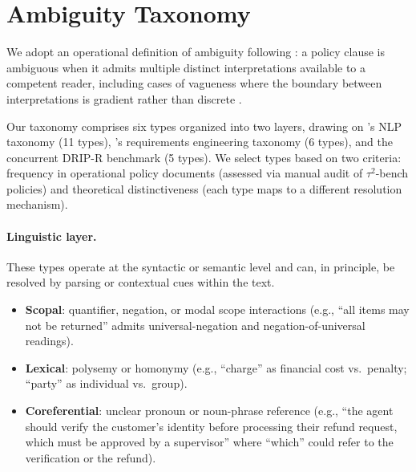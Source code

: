 \section{Ambiguity Taxonomy}
\label{sec:taxonomy}

We adopt an operational definition of ambiguity following \citet{wasow_ambiguity_2005}: a policy clause is ambiguous when it admits multiple distinct interpretations available to a competent reader, including cases of vagueness where the boundary between interpretations is gradient rather than discrete \citep{kennedy_vagueness_2007}.

Our taxonomy comprises six types organized into two layers, drawing on \citet{li_ambiguity_taxonomy_2024}'s NLP taxonomy (11 types), \citet{massey_ambiguity_re_2014}'s requirements engineering taxonomy (6 types), and the concurrent DRIP-R benchmark \citep{drip_r_2026} (5 types). We select types based on two criteria: frequency in operational policy documents (assessed via manual audit of $\tau^2$-bench policies) and theoretical distinctiveness (each type maps to a different resolution mechanism).

\paragraph{Linguistic layer.} These types operate at the syntactic or semantic level and can, in principle, be resolved by parsing or contextual cues within the text.
\begin{itemize}
\item \textbf{Scopal}: quantifier, negation, or modal scope interactions (e.g., ``all items may not be returned'' admits universal-negation and negation-of-universal readings).
\item \textbf{Lexical}: polysemy or homonymy (e.g., ``charge'' as financial cost vs.\ penalty; ``party'' as individual vs.\ group).
\item \textbf{Coreferential}: unclear pronoun or noun-phrase reference (e.g., ``the agent should verify the customer's identity before processing their refund request, which must be approved by a supervisor'' where ``which'' could refer to the verification or the refund).
\end{itemize}

